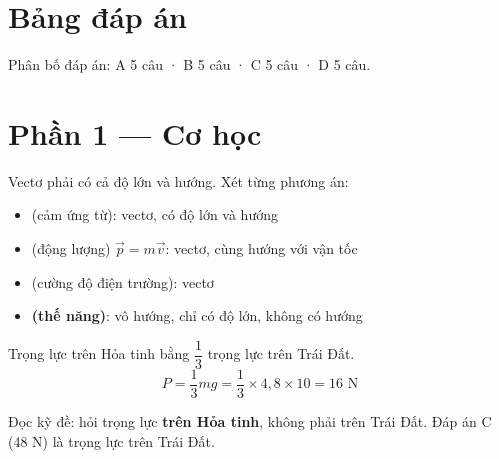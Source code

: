 \documentclass[11pt, a4paper]{article}
\begin{document}

\section*{Bảng đáp án}


\vspace{0.2cm}
\noindent Phân bố đáp án: A 5 câu · B 5 câu · C 5 câu · D 5 câu.

\section{Phần 1 — Cơ học}

\begin{dapan}[1 — Đáp án B]
Vectơ phải có cả độ lớn và hướng. Xét từng phương án:

\begin{itemize}[leftmargin=1.4em, itemsep=2pt]
\item {} (cảm ứng từ): vectơ, có độ lớn và hướng
\item {} (động lượng) $\vec{p} = m\vec{v}$: vectơ, cùng hướng với vận tốc
\item {} (cường độ điện trường): vectơ
\item \textbf{ (thế năng)}: vô hướng, chỉ có độ lớn, không có hướng
\end{itemize}
\end{dapan}

\begin{dapan}[2 — Đáp án B]
Trọng lực trên Hỏa tinh bằng $\dfrac{1}{3}$ trọng lực trên Trái Đất.
\[
P = \frac{1}{3}mg = \frac{1}{3}\times 4{,}8 \times 10 = 16 \text{ N}
\]

 Đọc kỹ đề: hỏi trọng lực \textbf{trên Hỏa tinh}, không phải trên Trái Đất. Đáp án C (48 N) là trọng lực trên Trái Đất.
\end{dapan}
\end{document}

